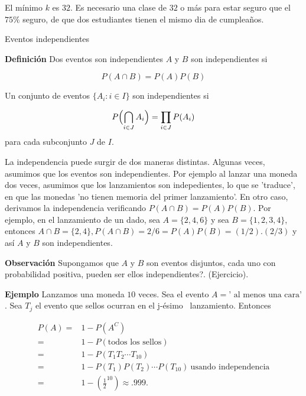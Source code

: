 \documentclass{article}\usepackage[]{graphicx}\usepackage[]{color}
\begin{document}
\vspace{0.3cm}

El m\'inimo $k$ es $32$. Es necesario una clase de  $32$ o  m\'as para estar seguro que el $75\%$ seguro, de que dos estudiantes tienen  el mismo dia de cumplea\~nos.
 
 \vspace{0.5cm}
 
 
 {\large Eventos independientes}

\vspace{0.6cm}

\textbf{Definici\'on} Dos eventos son independientes $A$ y $B$ son independientes si

\[
P(A\cap B) = P(A)P(B)
\]

Un conjunto de eventos $\{ A_i: i \in I \}$ son independientes si

\[
P\Bigl(  \bigcap\limits_{i \in J}A_i \Bigr)  = \prod_{i \in J}P(A_i)  
\]
para cada subconjunto $J$ de $I$.

\vspace{0.3cm}

La independencia puede surgir de dos maneras distintas. Algunas veces, asumimos que los eventos son independientes. Por ejemplo al lanzar una moneda dos veces, asumimos que los lanzamientos son indepedientes, lo que se 'traduce', en que las monedas 'no tienen memoria del primer lanzamiento'. En otro caso, derivamos la independencia verificando $P(A\cap B) = P(A)P(B)$. Por ejemplo, en el lanzamiento de un dado, sea $A = \{ 2, 4, 6 \}$ y sea $B = \{1, 2, 3, 4\}$, entonces $A \cap B = \{2, 4\},  P(A\cap B) = 2/6 = P(A)P(B) = (1/2). (2/3)$ y as\'i $A$ y $B$ son independientes. 


\vspace{0.2cm}

\textbf{Observaci\'on} Supongamos que $A$ y $B$ son eventos disjuntos, cada uno con probabilidad positiva, pueden ser ellos independientes?. (Ejercicio).


\vspace{0.5cm}

\textbf{Ejemplo} Lanzamos una moneda $10$ veces. Sea el evento $A = \mbox{' al menos una cara'}$. Sea $T_j$ el evento  que sellos ocurran en el  \mbox{j-\'esimo } lanzamiento. Entonces

\begin{align*}
P(A) =& 1-P(A^C)\\
     =& 1 - P(\mbox{todos los sellos})\\
     =& 1 - P(T_1T_2 \cdots T_{10})\\
     =&  1- P(T_1)P(T_2)\cdots P(T_{10})  \  \mbox {usando independencia}\\
     =& 1 - (\frac{1}{2}^{10}) \approx .999.
\end{align*}
\end{document}
